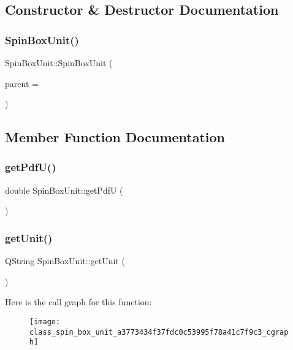 \subsection{Constructor \& Destructor Documentation}
\mbox{\label{class_spin_box_unit_a9c31cc6aa85951ce843671d2ab9c437f}} 
\subsubsection{Spin\+Box\+Unit()}
{\footnotesize\ttfamily Spin\+Box\+Unit\+::\+Spin\+Box\+Unit (\begin{DoxyParamCaption}\item[{Q\+Widget $\ast$}]{parent = {} }\end{DoxyParamCaption})\hspace{0.3cm}{\ttfamily [explicit]}}



\subsection{Member Function Documentation}
\mbox{\label{class_spin_box_unit_a248b56ee6305fd24e96d5e8426a27228}} 
\subsubsection{get\+Pdf\+U()}
{\footnotesize\ttfamily double Spin\+Box\+Unit\+::get\+PdfU (\begin{DoxyParamCaption}{ }\end{DoxyParamCaption})}

\mbox{\label{class_spin_box_unit_a3773434f37fdc0c53995f78a41c7f9c3}} 
\subsubsection{get\+Unit()}
{\footnotesize\ttfamily Q\+String Spin\+Box\+Unit\+::get\+Unit (\begin{DoxyParamCaption}{ }\end{DoxyParamCaption})}

Here is the call graph for this function\+:\nopagebreak
\begin{figure}[H]
\begin{center}
\leavevmode
\texttt{[image: class\_spin\_box\_unit\_a3773434f37fdc0c53995f78a41c7f9c3\_cgraph]}
\end{center}
\end{figure}
\mbox{\label{class_spin_box_unit_a7e5d92281b053b41eae4e3cbf332eed4}} 
